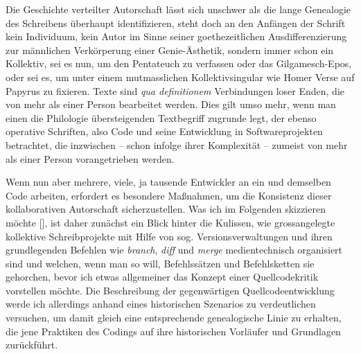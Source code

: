 \documentclass[a4paper,11pt]{article}
\newcommand{\anzeige}{\textbf{\color{hokkaido}\huge{\raisebox{-0.18ex}{$\bullet$}}\color{black}}}
\begin{document}
\begin{itemize}
\end{itemize}

\newpage

\noindent Die Geschichte verteilter Autorschaft lässt sich unschwer als die lange Genealogie des Schreibens überhaupt identifizieren, steht doch an den Anfängen der Schrift kein Individuum, kein Autor im Sinne seiner goethezeitlichen Ausdifferenzierung zur männlichen Verkörperung einer Genie-Ästhetik, sondern immer schon ein Kollektiv, sei es nun, um den Pentateuch zu verfassen oder das Gilgamesch-Epos, oder sei es, um unter einem mutmasslichen Kollektivsingular wie Homer Verse auf Papyrus zu fixieren. Texte sind \emph{qua definitionem} Verbindungen loser Enden, die von mehr als einer Person bearbeitet werden. Dies gilt umso mehr, wenn man einen die Philologie übersteigenden Textbegriff zugrunde legt, der ebenso operative Schriften, also Code und seine Entwicklung in Softwareprojekten betrachtet, die inzwischen – schon infolge ihrer Komplexität – zumeist von mehr als einer Person vorangetrieben werden. 

Wenn nun aber mehrere, viele, ja tausende Entwickler an ein und demselben Code arbeiten, erfordert es besondere Maßnahmen, um die Konsistenz dieser kollaborativen Autorschaft sicherzustellen. Was ich im Folgenden skizzieren möchte [\anzeige], ist daher zunächst ein Blick hinter die Kulissen, wie grossangelegte kollektive Schreibprojekte mit Hilfe von sog. Versionsverwaltungen und ihren grundlegenden Befehlen wie \emph{branch}, \emph{diff} und \emph{merge} medientechnisch organisiert sind und welchen, wenn man so will, Befehlssätzen und Befehlsketten sie gehorchen, bevor ich etwas allgemeiner das Konzept einer Quellcodekritik vorstellen möchte. Die Beschreibung der gegenwärtigen Quellcodeentwicklung werde ich allerdings anhand eines historischen Szenarios zu verdeutlichen versuchen, um damit gleich eine entsprechende genealogische Linie zu erhalten, die jene Praktiken des Codings auf ihre historischen Vorläufer und Grundlagen zurückführt.
\end{document}
